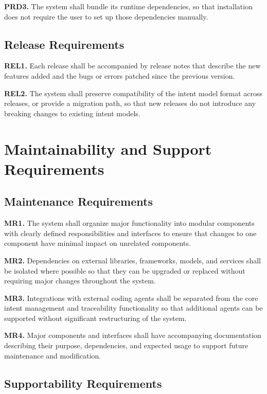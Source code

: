 \documentclass[12pt]{article}
\begin{document}
\medskip
\noindent\textbf{PRD3.} The system shall bundle its runtime
dependencies, so that installation does not require the user to set up those dependencies manually.

\subsection{Release Requirements}

\medskip
\noindent\textbf{REL1.} Each release shall be accompanied by release notes that
describe the new features added and the bugs or errors patched since the previous
version.

\medskip
\noindent\textbf{REL2.} The system shall preserve compatibility of the intent
model format across releases, or provide a migration path, so that new releases
do not introduce any breaking changes to existing intent models. 

\section{Maintainability and Support Requirements}
\subsection{Maintenance Requirements}

\noindent\textbf{MR1.} The system shall organize major functionality into modular components with clearly defined responsibilities and interfaces to ensure that changes to one component have minimal impact on unrelated components.

\noindent\textbf{MR2.} Dependencies on external libraries, frameworks, models, and services shall be isolated where possible so that they can be upgraded or replaced without requiring major changes throughout the system.

\noindent\textbf{MR3.} Integrations with external coding agents shall be separated from the core intent management and traceability functionality so that additional agents can be supported without significant restructuring of the system.

\noindent\textbf{MR4.} Major components and interfaces shall have accompanying documentation describing their purpose, dependencies, and expected usage to support future maintenance and modification.

\subsection{Supportability Requirements}
\end{document}
